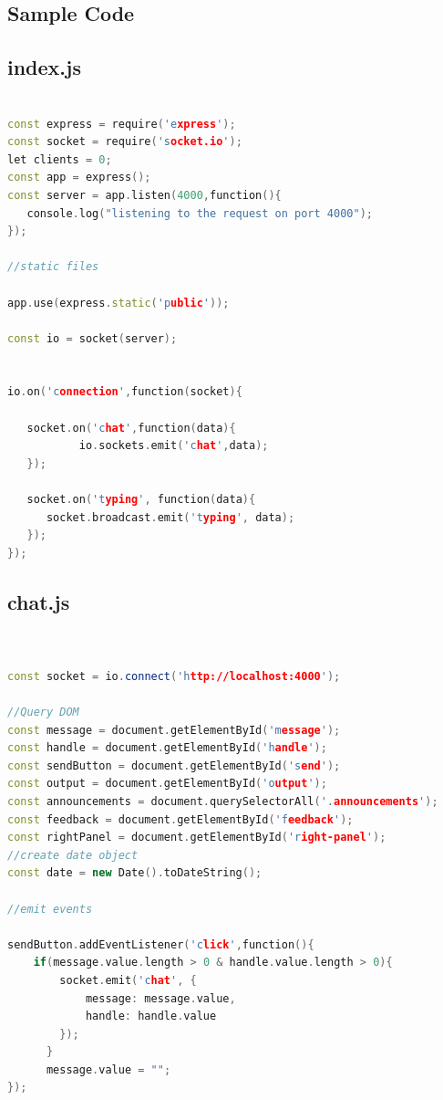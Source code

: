\documentclass{fisatproject}
\begin{document}
\begin{appendices}
\chapter{Sample Code}
\section{index.js}
\begin{lstlisting}[language=c++]

const express = require('express');
const socket = require('socket.io');
let clients = 0;
const app = express();
const server = app.listen(4000,function(){
   console.log("listening to the request on port 4000");
});

//static files

app.use(express.static('public'));

const io = socket(server);


io.on('connection',function(socket){

   socket.on('chat',function(data){
           io.sockets.emit('chat',data);
   });

   socket.on('typing', function(data){
      socket.broadcast.emit('typing', data);
   });
});

\end{lstlisting}
\newpage
\section{chat.js}
\begin{lstlisting}[language=c++]


const socket = io.connect('http://localhost:4000');

//Query DOM
const message = document.getElementById('message');
const handle = document.getElementById('handle');
const sendButton = document.getElementById('send');
const output = document.getElementById('output');
const announcements = document.querySelectorAll('.announcements');
const feedback = document.getElementById('feedback');
const rightPanel = document.getElementById('right-panel');
//create date object
const date = new Date().toDateString();

//emit events

sendButton.addEventListener('click',function(){
    if(message.value.length > 0 & handle.value.length > 0){
        socket.emit('chat', {
            message: message.value,
            handle: handle.value
        });
      }
      message.value = "";
});


\end{lstlisting}
\end{appendices}
\end{document}
